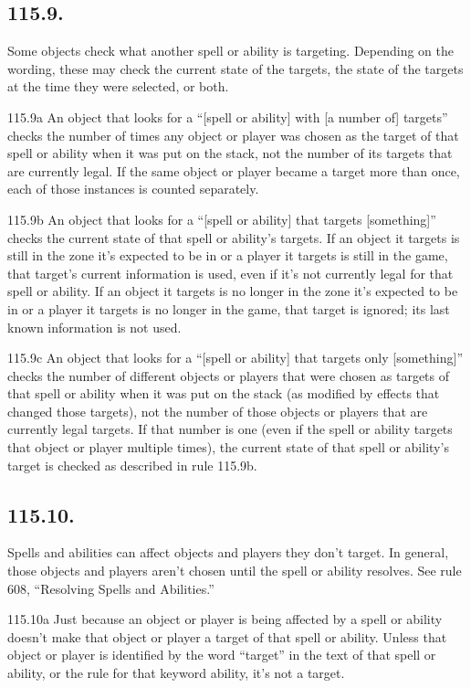 \subsection*{115.9.}
Some objects check what another spell or ability is targeting. Depending on the wording, these may check the current state of the targets, the state of the targets at the time they were selected, or both.

115.9a An object that looks for a “[spell or ability] with [a number of] targets” checks the number of times any object or player was chosen as the target of that spell or ability when it was put on the stack, not the number of its targets that are currently legal. If the same object or player became a target more than once, each of those instances is counted separately.

115.9b An object that looks for a “[spell or ability] that targets [something]” checks the current state of that spell or ability’s targets. If an object it targets is still in the zone it’s expected to be in or a player it targets is still in the game, that target’s current information is used, even if it’s not currently legal for that spell or ability. If an object it targets is no longer in the zone it’s expected to be in or a player it targets is no longer in the game, that target is ignored; its last known information is not used.

115.9c An object that looks for a “[spell or ability] that targets only [something]” checks the number of different objects or players that were chosen as targets of that spell or ability when it was put on the stack (as modified by effects that changed those targets), not the number of those objects or players that are currently legal targets. If that number is one (even if the spell or ability targets that object or player multiple times), the current state of that spell or ability’s target is checked as described in rule 115.9b.

\subsection*{115.10.}
Spells and abilities can affect objects and players they don’t target. In general, those objects and players aren’t chosen until the spell or ability resolves. See rule 608, “Resolving Spells and Abilities.”

115.10a Just because an object or player is being affected by a spell or ability doesn’t make that object or player a target of that spell or ability. Unless that object or player is identified by the word “target” in the text of that spell or ability, or the rule for that keyword ability, it’s not a target.

